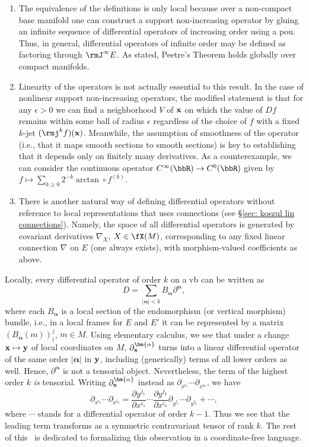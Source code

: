 \begin{rem}
    \begin{enumerate}
        \item The equivalence of the definitions is only local because over a non-compact base manifold one can construct a support non-increasing operator by gluing an infinite sequence of differential operators of increasing order using a \gls{pou}. Thus, in general, differential operators of infinite order may be defined as factoring through $\rmJ^\infty E$. As stated, Peetre's Theorem holds globally over compact manifolds. 
        \item Linearity of the operators is not actually essential to this result. In the case of nonlinear support non-increasing operators, the modified statement is that for any $\epsilon>0$ we can find a neighborhood $V$ of $\bf{x}$ on which the value of $Df$ remains within some ball of radius $\epsilon$ regardless of the choice of $f$ with a fixed $k$-jet $(\rmj^kf)(\bf{x})$. Meanwhile, the assumption of smoothness of the operator (i.e., that it maps smooth sections to smooth sections) is key to establishing that it depends only on finitely many derivatives. As a counterexample, we can consider the continuous operator $C^\infty(\bbR)\to C^0(\bbR)$ given by $f\mapsto \sum_{k\geq 0} 2^{-k}\arctan\circ f^{(k)}$.
        \item There is another natural way of defining differential operators without reference to local representations that uses connections (see \S\ref{sec: koszul lin connections}). Namely, the space of all differential operators is generated by covariant derivatives $\nabla_X$, $X\in\fX(M)$, corresponding to any fixed linear connection $\nabla$ on $E$ (one always exists), with morphism-valued coefficients as above.
    \end{enumerate}
\end{rem}

Locally, every differential operator of order $k$ on a \gls{vb} can be written as 
\[D=\sum_{|\bm{\alpha}|<k}B_{\bm{\alpha}}\partial^{\bm{\alpha}},\]
where each $B_{\bm{\alpha}}$ is a local section of the endomorphism (or vertical morphism) bundle, i.e., in a local frames for $E$ and $E'$ it can be represented by a matrix $(B_{\bm{\alpha}}(m))_i^j$, $m\in M$. Using elementary calculus,  we see that under a change $\bf{x}\mapsto \bf{y}$ of local coordinates on $M$, $\partial^{\bm{\alpha}}_{\bf{x}}$ turns into a linear differential operator of the same order $|\bm{\alpha}|$ in $\bf{y}$, including (generically) terms of all lower orders as well. Hence, $\partial^{\bm{\alpha}}$ is not a tensorial object. Nevertheless, the term of the highest order $k$ \emph{is} tensorial. Writing $\partial^{\bm{\alpha}}_{\bf{x}}$ instead as $\partial_{x^{i_1}}\cdots \partial_{x^{i_k}}$, we have 
\[\partial_{x^{i_1}}\cdots \partial_{x^{i_k}}=\frac{\partial y^{j_1}}{\partial x^{i_1}}\cdots \frac{\partial y^{j_k}}{\partial x^{i_k}}\partial_{y^{j_1}}\cdots \partial_{y^{j_k}}+\cdots ,\]
where $\cdots$ stands for a differential operator of order $k-1$. Thus we see that the leading term transforms as a symmetric contravariant tensor of rank $k$. The rest of this \sect\ is dedicated to formalizing this observation in a coordinate-free language.

